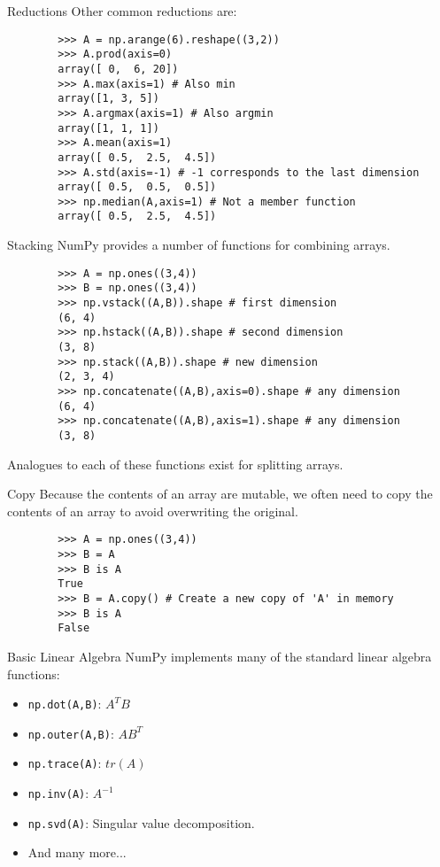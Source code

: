 \documentclass[serif,xcolor=pdftex,dvipsnames,table,hyperref={bookmarks=false,breaklinks}]{beamer}
\begin{document}
\begin{frame}[t,fragile]{Reductions}
	Other common reductions are:
	
	\pause	
	\begin{lstlisting}
		>>> A = np.arange(6).reshape((3,2))
		>>> A.prod(axis=0)
		array([ 0,  6, 20])
		>>> A.max(axis=1) # Also min
		array([1, 3, 5])
		>>> A.argmax(axis=1) # Also argmin
		array([1, 1, 1])
		>>> A.mean(axis=1)
		array([ 0.5,  2.5,  4.5])
		>>> A.std(axis=-1) # -1 corresponds to the last dimension
		array([ 0.5,  0.5,  0.5])
		>>> np.median(A,axis=1) # Not a member function
		array([ 0.5,  2.5,  4.5])
	\end{lstlisting}
\end{frame}

\begin{frame}[t,fragile]{Stacking}
	NumPy provides a number of functions for combining arrays.
	
	\pause
	\begin{lstlisting}
		>>> A = np.ones((3,4))
		>>> B = np.ones((3,4))
		>>> np.vstack((A,B)).shape # first dimension
		(6, 4)
		>>> np.hstack((A,B)).shape # second dimension
		(3, 8)
		>>> np.stack((A,B)).shape # new dimension
		(2, 3, 4)
		>>> np.concatenate((A,B),axis=0).shape # any dimension
		(6, 4)
		>>> np.concatenate((A,B),axis=1).shape # any dimension
		(3, 8)
	\end{lstlisting}
	\pause
	Analogues to each of these functions exist for splitting arrays.
\end{frame}

\begin{frame}[t,fragile]{Copy}
	Because the contents of an array are mutable, we often need to copy the contents of an array to avoid overwriting the original.
	
	\pause
	\begin{lstlisting}
		>>> A = np.ones((3,4))
		>>> B = A
		>>> B is A
		True
		>>> B = A.copy() # Create a new copy of 'A' in memory
		>>> B is A
		False
	\end{lstlisting}
\end{frame}

\begin{frame}[t,fragile]{Basic Linear Algebra}
	NumPy implements many of the standard linear algebra functions:
	
	\begin{itemize}[<+->]
		\item \verb|np.dot(A,B)|: $A^T B$
		\item \verb|np.outer(A,B)|: $A B^T$
		\item \verb|np.trace(A)|: $tr(A)$
		\item \verb|np.inv(A)|: $A^{-1}$
		\item \verb|np.svd(A)|: Singular value decomposition.
		\item And many more...
	\end{itemize}
		
\end{frame}
\end{document}
